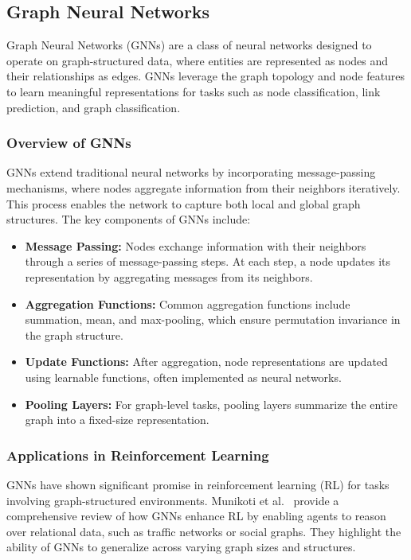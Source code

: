 \documentclass[runningheads]{llncs}
\begin{document}
\subsection{Graph Neural Networks}
\label{sss:gnn}
Graph Neural Networks (GNNs) are a class of neural networks designed to operate on graph-structured data, where entities are represented as nodes and their relationships as edges. GNNs leverage the graph topology and node features to learn meaningful representations for tasks such as node classification, link prediction, and graph classification.

\subsubsection{Overview of GNNs}
GNNs extend traditional neural networks by incorporating message-passing mechanisms, where nodes aggregate information from their neighbors iteratively. This process enables the network to capture both local and global graph structures. The key components of GNNs include:

\begin{itemize}
    \item \textbf{Message Passing:} Nodes exchange information with their neighbors through a series of message-passing steps. At each step, a node updates its representation by aggregating messages from its neighbors.
    \item \textbf{Aggregation Functions:} Common aggregation functions include summation, mean, and max-pooling, which ensure permutation invariance in the graph structure.
    \item \textbf{Update Functions:} After aggregation, node representations are updated using learnable functions, often implemented as neural networks.
    \item \textbf{Pooling Layers:} For graph-level tasks, pooling layers summarize the entire graph into a fixed-size representation.
\end{itemize}

\subsubsection{Applications in Reinforcement Learning}
GNNs have shown significant promise in reinforcement learning (RL) for tasks involving graph-structured environments. Munikoti et al.~\cite{gnndrl:munikoti2022challengesopportunitiesdeepreinforcement} provide a comprehensive review of how GNNs enhance RL by enabling agents to reason over relational data, such as traffic networks or social graphs. They highlight the ability of GNNs to generalize across varying graph sizes and structures.
\end{document}
